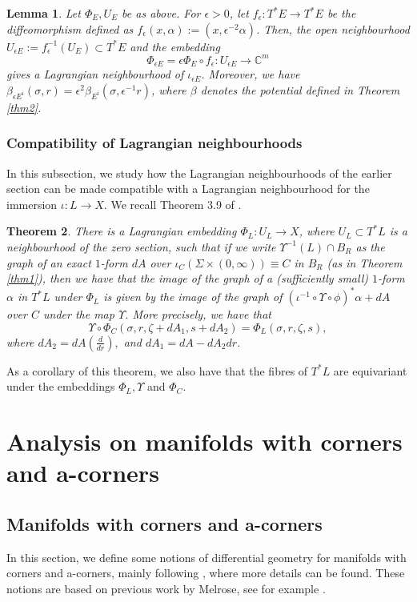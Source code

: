 \documentclass[10pt, a4paper]{article}
\theoremstyle{plain}%
\newtheorem{theorem}{Theorem}[section]
\newtheorem{lem}[theorem]{Lemma}
\theoremstyle{definition}
\numberwithin{figure}{section}
\numberwithin{equation}{section}
\newcommand{\rt}{\rightarrow}
\begin{document}
\begin{lem}\label{lem_scaling}
	Let $\Phi_E,U_E$ be as above. For $\epsilon >0$, let $f_\epsilon : T^*E \rightarrow T^*E$ be the diffeomorphism defined as $f_\epsilon (x,\alpha) := (x, \epsilon^{-2}\alpha)$. Then, the open neighbourhood $U_{\epsilon E} := f_\epsilon ^{-1}(U_E)\subset T^*E$ and the embedding \[
	\Phi_{\epsilon E} = \epsilon \Phi_E\circ f_\epsilon : U_{\epsilon E} \rightarrow \mathbb{C}^m
	\] 
	gives a Lagrangian neighbourhood of $\iota_{\epsilon E}$. Moreover, we have $\beta_{\epsilon E^i}(\sigma,r) = \epsilon^2\beta_{E^i}(\sigma, \epsilon^{-1}r)$, where $\beta$ denotes the potential defined in Theorem \ref{thm2}.
\end{lem}


\subsubsection{Compatibility of Lagrangian neighbourhoods}
In this subsection, we study how the Lagrangian neighbourhoods of the earlier section can be made compatible with a Lagrangian neighbourhood for the immersion $\iota: L\rt X$. We recall Theorem 3.9 of \cite{Joy04}.
\begin{theorem}\label{thm_compatible}
	There is a Lagrangian embedding $\Phi_L : U_L \rightarrow X$, where $U_L \subset T^*L$ is a neighbourhood of the zero section, such that if we write $\Upsilon^{-1}(L) \cap B_R$ as the graph of an exact $1$-form $dA$ over $\iota_C(\Sigma\times (0,\infty)) \equiv C$ in $B_R$ (as in Theorem \ref{thm1}), then we have that the image of the graph of a (sufficiently small) $1$-form $\alpha$ in $T^*L$ under $\Phi_L$ is given by the image of the graph of $(\iota^{-1}\circ \Upsilon\circ \phi)^*\alpha+dA$ over $C$ under the map $\Upsilon$. More precisely, we have that \[
	\Upsilon\circ \Phi_C( \sigma, r, \zeta + dA_1, s + dA_2) = \Phi_L (\sigma, r, \zeta, s),
	\]
	where $dA_2 = dA(\frac{d}{dr}),$ and $dA_1 = dA - dA_2dr$. 
\end{theorem}

 As a corollary of this theorem, we also have that the fibres of $T^*L$ are equivariant under the embeddings $\Phi_L, \Upsilon$ and $\Phi_C$.


\section{Analysis on manifolds with corners and a-corners}\label{sec_mancac}

\subsection{Manifolds with corners and a-corners}
In this section, we define some notions of differential geometry for manifolds with corners and a-corners, mainly following \cite{Joy16}, where more details can be found. These notions are based on previous work by Melrose, see for example \cite{Mel93,Mel96}.
\end{document}
